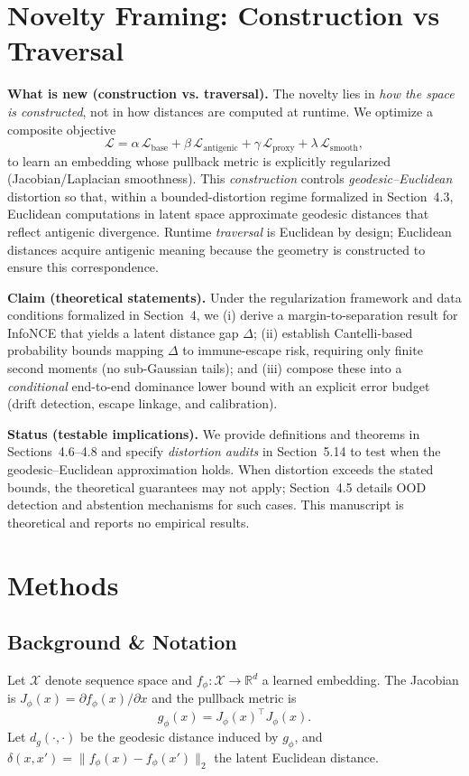 \documentclass[11pt]{article}
\begin{document}
\section{Novelty Framing: Construction vs Traversal}
\begin{mdframed}
\textbf{What is new (construction vs. traversal).}
The novelty lies in \emph{how the space is constructed}, not in how distances are computed at runtime.
We optimize a composite objective
\[
\mathcal{L}=\alpha\,\mathcal{L}_{\text{base}}+\beta\,\mathcal{L}_{\text{antigenic}}+\gamma\,\mathcal{L}_{\text{proxy}}+\lambda\,\mathcal{L}_{\text{smooth}},
\]
to learn an embedding whose pullback metric is explicitly regularized (Jacobian/Laplacian smoothness).
This \emph{construction} controls \emph{geodesic--Euclidean} distortion so that, within a bounded-distortion
regime formalized in Section~4.3, Euclidean computations in latent space approximate geodesic
distances that reflect antigenic divergence. Runtime \emph{traversal} is Euclidean by design; Euclidean
distances acquire antigenic meaning because the geometry is constructed to ensure this correspondence.

\textbf{Claim (theoretical statements).}
Under the regularization framework and data conditions formalized in Section~4, we (i) derive a
margin-to-separation result for InfoNCE that yields a latent distance gap $\Delta$; (ii) establish
Cantelli-based probability bounds mapping $\Delta$ to immune-escape risk, requiring only finite
second moments (no sub-Gaussian tails); and (iii) compose these into a \emph{conditional} end-to-end
dominance lower bound with an explicit error budget (drift detection, escape linkage, and calibration).

\textbf{Status (testable implications).}
We provide definitions and theorems in Sections~4.6–4.8 and specify \emph{distortion audits} in
Section~5.14 to test when the geodesic--Euclidean approximation holds. When distortion exceeds
the stated bounds, the theoretical guarantees may not apply; Section~4.5 details OOD detection and
abstention mechanisms for such cases. This manuscript is theoretical and reports no empirical results.
\end{mdframed}


\section{Methods}

\subsection{Background \& Notation}
Let $\mathcal{X}$ denote sequence space and $f_\phi:\mathcal{X}\to\mathbb{R}^d$ a learned embedding. The Jacobian is $J_\phi(x)=\partial f_\phi(x)/\partial x$ and the pullback metric is
\begin{equation}
g_\phi(x)=J_\phi(x)^{\top}J_\phi(x).
\end{equation}
Let $d_g(\cdot,\cdot)$ be the geodesic distance induced by $g_\phi$, and $\delta(x,x')=\|f_\phi(x)-f_\phi(x')\|_2$ the latent Euclidean distance.
\end{document}
